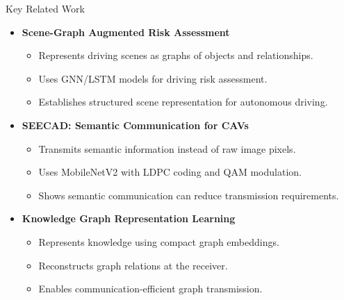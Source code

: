 \documentclass[aspectratio=169]{beamer}
\begin{document}
\begin{frame}{Key Related Work}

\begin{itemize}

    \item \textbf{Scene-Graph Augmented Risk Assessment \cite{yu2020scene}}
    \begin{itemize}
        \item Represents driving scenes as graphs of objects and relationships.
        \item Uses GNN/LSTM models for driving risk assessment.
        \item Establishes structured scene representation for autonomous driving.
    \end{itemize}

    \vspace{0.12cm}

    \item \textbf{SEECAD: Semantic Communication for CAVs \cite{ribouh2024seecad}}
    \begin{itemize}
        \item Transmits semantic information instead of raw image pixels.
        \item Uses MobileNetV2 with LDPC coding and QAM modulation.
        \item Shows semantic communication can reduce transmission requirements.
    \end{itemize}

    \vspace{0.12cm}

    \item \textbf{Knowledge Graph Representation Learning
    \cite{hello2024knowledge}}
    \begin{itemize}
        \item Represents knowledge using compact graph embeddings.
        \item Reconstructs graph relations at the receiver.
        \item Enables communication-efficient graph transmission.
    \end{itemize}

\end{itemize}

\end{frame}
\end{document}
